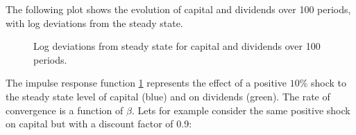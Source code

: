 \documentclass[12pt]{report}
\begin{document}
The following plot shows the evolution of capital and dividends over 100 periods, with log deviations from the steady state.

\datatable

\begin{figure}[h!]
    \centering
    \caption{Log deviations from steady state for capital and dividends over 100 periods.}
    \label{fig:impulse_response1}
\end{figure}
 
The impulse response function \ref{fig:impulse_response1} represents the effect of a positive $10\%$ shock to the steady state level of capital (blue)
and on dividends (green). The rate of convergence is a function of \(\beta\). Lets for example consider the same
positive shock on capital but with a discount factor of 0.9:
\datatable
\end{document}
